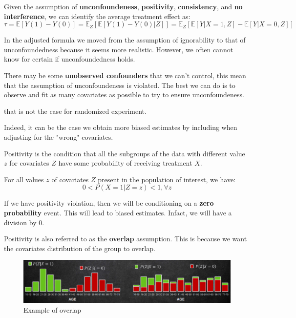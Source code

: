 \begin{definition}
    Given the assumption of \textbf{unconfoundeness}, \textbf{positivity}, \textbf{consistency}, and \textbf{no interference},
    we can identify the average treatment effect as:
    \begin{equation}
        \tau = \mathbb{E}[Y(1) - Y(0)] = \mathbb{E}_Z[\mathbb{E}[Y(1) - Y(0) | Z]]
        = \mathbb{E}_Z[\mathbb{E}[Y|X = 1, Z] - \mathbb{E}[Y|X = 0, Z]]
    \end{equation}
\end{definition}

In the adjusted formula we moved from the assumption of ignorability to that
of unconfoundedness because it seems more realistic. However, we often cannot know for certain if unconfoundedness holds.

There may be some \textbf{unobserved confounders} that we can't control, this mean that
the assumption of unconfoundeness is violated. The best we can do is to observe
and fit as many covariates as possible to try to ensure unconfoundeness.

\begin{note}
    that is not the case for randomized experiment.
\end{note}

Indeed, it can be the case we obtain more biased estimates by including when
adjusting for the "wrong" covariates.

\begin{definition}[Positivity]
    Positivity is the condition that all the subgroups af the data with different
    value $z$ for covariates $Z$ have some probability of receiving treatment $X$.

    For all values $z$ of covariates $Z$ present in the population of interest,
    we have:
    \begin{equation}
        0 < P(X = 1 | Z = z) < 1, \forall z 
    \end{equation}
\end{definition}

If we have positivity violation, then we will be conditioning on a \textbf{zero probability}
event. This will lead to biased estimates. Infact, we will have a division by $0$. 

Positivity is also referred to as the \textbf{overlap} assumption. This is because
we want the covariates distribution of the group to overlap. 

\begin{figure}[!ht]
    \centering
    \includegraphics[width=\textwidth]{img/overlap.png}
    \caption{Example of overlap}
    \label{fig:positivity}
\end{figure}

